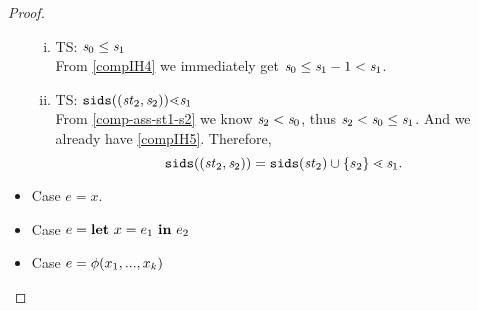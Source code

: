 \begin{proof}
\begin{itemize}
\begin{enumerate}[(i)]
	\item TS: $\mathit{s}_0 \le \mathit{s}_1$ \\
	From \eqref{compIH4} we immediately get $\mathit{s}_0 \le \mathit{s}_1 -1 < \mathit{s}_1$.\\
	
	\item TS: $\sids{(\st_2,\s_2)} {\.<} \s_1$  \\
	From \eqref{comp-ass-st1-s2} we know $\mathit{s}_2 < \mathit{s}_0$, thus $ \mathit{s}_2 < \mathit{s}_0 \le \mathit{s}_1$. 
	And we already have \eqref{compIH5}. Therefore,
	$$\sids{(\st_2,\s_2)} = \sids{\st_2} \cup \{s_2\} \.< \s_1.$$
	
	\end{enumerate}
 
 \item Case $e = x$.
 \item Case $e = \mathbf{let} \ x = e_1 \ \mathbf{in} \ e_2$
 \item Case $e = \phi(x_1,...,x_k)$	
	\end{itemize}	
\end{proof}


